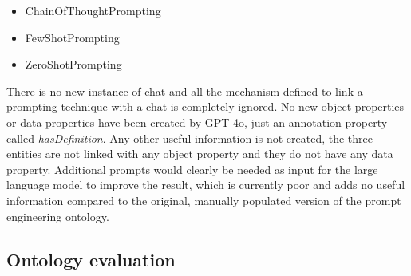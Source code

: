 \begin{itemize}
    \item ChainOfThoughtPrompting
    \item FewShotPrompting
    \item ZeroShotPrompting
\end{itemize}
There is no new instance of chat and all the mechanism defined to link a prompting technique with a chat is completely ignored. No new object properties or data properties have been created by GPT-4o, just an annotation property called \textit{hasDefinition}. Any other useful information is not created, the three entities are not linked with any object property and they do not have any data property. Additional prompts would clearly be needed as input for the large language model to improve the result, which is currently poor and adds no useful information compared to the original, manually populated version of the prompt engineering ontology.

\newpage
\subsection{Ontology evaluation}
